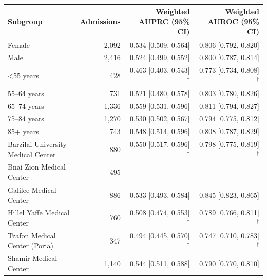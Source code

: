 \begin{tabular}{lrrr}
\toprule
Subgroup & Admissions & Weighted AUPRC (95\% CI) & Weighted AUROC (95\% CI) \\
\midrule
Female & 2,092 & 0.534 [0.509, 0.564] & 0.806 [0.792, 0.820] \\
Male & 2,416 & 0.524 [0.499, 0.552] & 0.800 [0.787, 0.814] \\
\midrule
<55 years & 428 & 0.463 [0.403, 0.543]$^{\dagger}$ & 0.773 [0.734, 0.808]$^{\dagger}$ \\
55–64 years & 731 & 0.521 [0.480, 0.578] & 0.803 [0.780, 0.826] \\
65–74 years & 1,336 & 0.559 [0.531, 0.596] & 0.811 [0.794, 0.827] \\
75–84 years & 1,270 & 0.530 [0.502, 0.567] & 0.794 [0.775, 0.812] \\
85+ years & 743 & 0.548 [0.514, 0.596] & 0.808 [0.787, 0.829] \\
\midrule
Barzilai University Medical Center & 880 & 0.550 [0.517, 0.596]$^{\dagger}$ & 0.798 [0.775, 0.819]$^{\dagger}$ \\
Bnai Zion Medical Center & 495 & -- & -- \\
Galilee Medical Center & 886 & 0.533 [0.493, 0.584] & 0.845 [0.823, 0.865] \\
Hillel Yaffe Medical Center & 760 & 0.508 [0.474, 0.553]$^{\dagger}$ & 0.789 [0.766, 0.811]$^{\dagger}$ \\
Tzafon Medical Center (Poria) & 347 & 0.494 [0.445, 0.570]$^{\dagger}$ & 0.747 [0.710, 0.783]$^{\dagger}$ \\
Shamir Medical Center & 1,140 & 0.544 [0.511, 0.588] & 0.790 [0.770, 0.810] \\
\bottomrule
\end{tabular}
